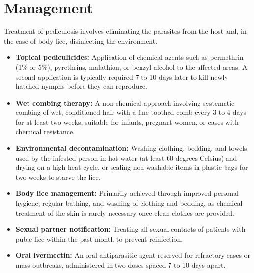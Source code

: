 \section*{Management}
Treatment of pediculosis involves eliminating the parasites from the host and, in the case of body lice, disinfecting the environment.
\begin{itemize}
    \item \textbf{Topical pediculicides:} Application of chemical agents such as permethrin (1\% or 5\%), pyrethrins, malathion, or benzyl alcohol to the affected areas. A second application is typically required 7 to 10 days later to kill newly hatched nymphs before they can reproduce.
    \item \textbf{Wet combing therapy:} A non-chemical approach involving systematic combing of wet, conditioned hair with a fine-toothed comb every 3 to 4 days for at least two weeks, suitable for infants, pregnant women, or cases with chemical resistance.
    \item \textbf{Environmental decontamination:} Washing clothing, bedding, and towels used by the infested person in hot water (at least 60 degrees Celsius) and drying on a high heat cycle, or sealing non-washable items in plastic bags for two weeks to starve the lice.
    \item \textbf{Body lice management:} Primarily achieved through improved personal hygiene, regular bathing, and washing of clothing and bedding, as chemical treatment of the skin is rarely necessary once clean clothes are provided.
    \item \textbf{Sexual partner notification:} Treating all sexual contacts of patients with pubic lice within the past month to prevent reinfection.
    \item \textbf{Oral ivermectin:} An oral antiparasitic agent reserved for refractory cases or mass outbreaks, administered in two doses spaced 7 to 10 days apart.
\end{itemize}

